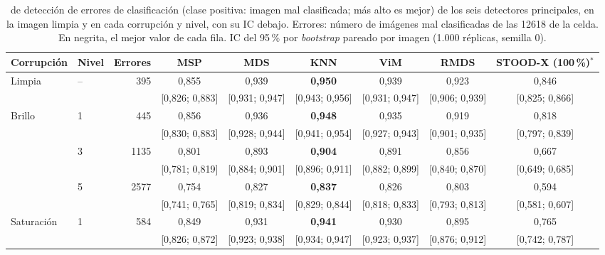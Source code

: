 \begin{table}[tbp]
\centering
\scriptsize
\setlength{\tabcolsep}{2.5pt}
\caption{\AUROC de detección de errores de clasificación (clase positiva: imagen mal clasificada; más alto es mejor) de los seis detectores principales, en la imagen limpia y en cada corrupción y nivel, con su IC debajo. Errores: número de imágenes mal clasificadas de las \num{12618} de la celda. En negrita, el mejor valor de cada fila. IC del 95\,\% por \emph{bootstrap} pareado por imagen (1.000 réplicas, semilla 0).}
\label{tab:ood-corr-auroc-err}
\begin{tabular}{llrcccccc}
\toprule
Corrupción & Nivel & Errores & MSP & MDS & KNN & ViM & RMDS & STOOD-X (100\,\%)$^{\ast}$ \\
\midrule
Limpia & -- & \num{395} & 0{,}855 & 0{,}939 & \textbf{0{,}950} & 0{,}939 & 0{,}923 & 0{,}846 \\
& & & {\tiny [0{,}826; 0{,}883]} & {\tiny [0{,}931; 0{,}947]} & {\tiny [0{,}943; 0{,}956]} & {\tiny [0{,}931; 0{,}947]} & {\tiny [0{,}906; 0{,}939]} & {\tiny [0{,}825; 0{,}866]} \\[1pt]
\midrule
Brillo & 1 & \num{445} & 0{,}856 & 0{,}936 & \textbf{0{,}948} & 0{,}935 & 0{,}919 & 0{,}818 \\
& & & {\tiny [0{,}830; 0{,}883]} & {\tiny [0{,}928; 0{,}944]} & {\tiny [0{,}941; 0{,}954]} & {\tiny [0{,}927; 0{,}943]} & {\tiny [0{,}901; 0{,}935]} & {\tiny [0{,}797; 0{,}839]} \\[1pt]
 & 3 & \num{1135} & 0{,}801 & 0{,}893 & \textbf{0{,}904} & 0{,}891 & 0{,}856 & 0{,}667 \\
& & & {\tiny [0{,}781; 0{,}819]} & {\tiny [0{,}884; 0{,}901]} & {\tiny [0{,}896; 0{,}911]} & {\tiny [0{,}882; 0{,}899]} & {\tiny [0{,}840; 0{,}870]} & {\tiny [0{,}649; 0{,}685]} \\[1pt]
 & 5 & \num{2577} & 0{,}754 & 0{,}827 & \textbf{0{,}837} & 0{,}826 & 0{,}803 & 0{,}594 \\
& & & {\tiny [0{,}741; 0{,}765]} & {\tiny [0{,}819; 0{,}834]} & {\tiny [0{,}829; 0{,}844]} & {\tiny [0{,}818; 0{,}833]} & {\tiny [0{,}793; 0{,}813]} & {\tiny [0{,}581; 0{,}607]} \\[1pt]
\addlinespace[2pt]
Saturación & 1 & \num{584} & 0{,}849 & 0{,}931 & \textbf{0{,}941} & 0{,}930 & 0{,}895 & 0{,}765 \\
& & & {\tiny [0{,}826; 0{,}872]} & {\tiny [0{,}923; 0{,}938]} & {\tiny [0{,}934; 0{,}947]} & {\tiny [0{,}923; 0{,}937]} & {\tiny [0{,}876; 0{,}912]} & {\tiny [0{,}742; 0{,}787]} \\[1pt]

\end{tabular}
\end{table}
